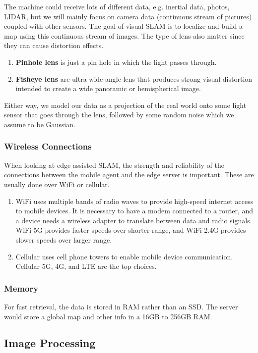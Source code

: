 \documentclass{article}
\begin{document}
  The machine could receive lots of different data, e.g. inertial data, photos, LIDAR, but we will mainly focus on camera data (continuous stream of pictures) coupled with other sensors. The goal of visual SLAM is to localize and build a map using this continuous stream of images. The type of lens also matter since they can cause distortion effects. 
  \begin{enumerate}
      \item \textbf{Pinhole lens} is just a pin hole in which the light passes through. 
      \item \textbf{Fisheye lens} are ultra wide-angle lens that produces strong visual distortion intended to create a wide panoramic or hemispherical image.
  \end{enumerate}
  Either way, we model our data as a projection of the real world onto some light sensor that goes through the lens, followed by some random noise which we assume to be Gaussian. 

  \subsubsection{Wireless Connections}

  When looking at edge assisted SLAM, the strength and reliability of the connections between the mobile agent and the edge server is important. These are usually done over WiFi or cellular. 
  \begin{enumerate}
      \item WiFi uses multiple bands of radio waves to provide high-speed internet access to mobile devices. It is necessary to have a modem connected to a router, and a device needs a wireless adapter to translate between data and radio signals. WiFi-5G provides faster speeds over shorter range, and WiFi-2.4G provides slower speeds over larger range. 
      \item Cellular uses cell phone towers to enable mobile device communication. Cellular 5G, 4G, and LTE are the top choices. 
  \end{enumerate}

  \subsubsection{Memory}

  For fast retrieval, the data is stored in RAM rather than an SSD. The server would store a global map and other info in a 16GB to 256GB RAM. 
  \subsection{Image Processing}
   
\end{document}
